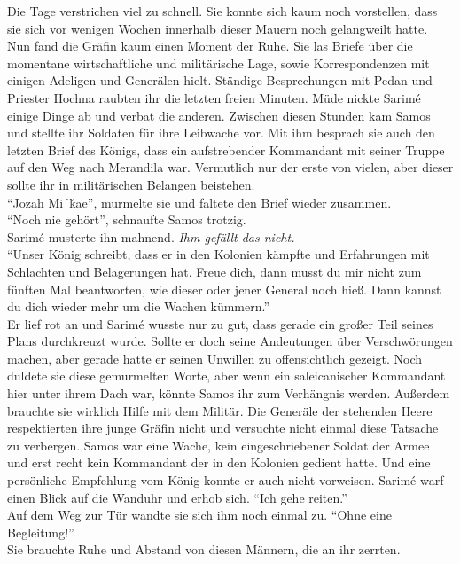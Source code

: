 Die Tage verstrichen viel zu schnell. Sie konnte sich kaum noch vorstellen, dass sie sich vor 
wenigen Wochen innerhalb dieser Mauern noch gelangweilt hatte. Nun fand die Gräfin kaum einen 
Moment der Ruhe. Sie las Briefe über die momentane wirtschaftliche und militärische Lage, sowie 
Korrespondenzen mit einigen Adeligen und Generälen hielt. Ständige Besprechungen mit Pedan 
und Priester Hochna raubten ihr die letzten freien Minuten. Müde nickte Sarimé einige Dinge ab und 
verbat die anderen. Zwischen diesen Stunden kam Samos und stellte ihr Soldaten für ihre 
Leibwache vor. Mit ihm besprach sie auch den letzten Brief des Königs, dass ein aufstrebender 
Kommandant mit seiner Truppe auf den Weg nach Merandila war. Vermutlich nur der erste von vielen, 
aber dieser sollte ihr in militärischen Belangen beistehen. \\
``Jozah Mi´ḱae'', murmelte sie und faltete den Brief wieder zusammen.\\
``Noch nie gehört'', schnaufte Samos trotzig.\\
Sarimé musterte ihn mahnend. \textit{Ihm gefällt das nicht.}\\
``Unser König schreibt, dass er in den Kolonien kämpfte und Erfahrungen mit Schlachten und 
Belagerungen hat. Freue dich, dann musst du mir nicht zum fünften Mal beantworten, wie dieser oder 
jener General noch hieß. Dann kannst du dich wieder mehr um die Wachen kümmern.''\\
Er lief rot an und Sarimé wusste nur zu gut, dass gerade ein großer Teil seines Plans durchkreuzt 
wurde. Sollte er doch seine Andeutungen über Verschwörungen machen, aber gerade hatte er seinen 
Unwillen zu offensichtlich gezeigt. Noch duldete sie diese gemurmelten Worte, aber wenn ein 
saleicanischer Kommandant hier unter ihrem Dach war, könnte Samos ihr zum Verhängnis werden. 
Außerdem brauchte sie wirklich Hilfe mit dem Militär. Die Generäle der stehenden Heere respektierten 
ihre junge Gräfin nicht und versuchte nicht einmal diese Tatsache zu verbergen. Samos war eine 
Wache, kein eingeschriebener Soldat der Armee und erst recht kein Kommandant der in den Kolonien 
gedient hatte. Und eine persönliche Empfehlung vom König konnte er auch nicht vorweisen. Sarimé warf 
einen Blick auf die Wanduhr und erhob sich. ``Ich gehe reiten.''\\
Auf dem Weg zur Tür wandte sie sich ihm noch einmal zu. ``Ohne eine Begleitung!''\\
Sie brauchte Ruhe und Abstand von diesen Männern, die an ihr zerrten. \\

